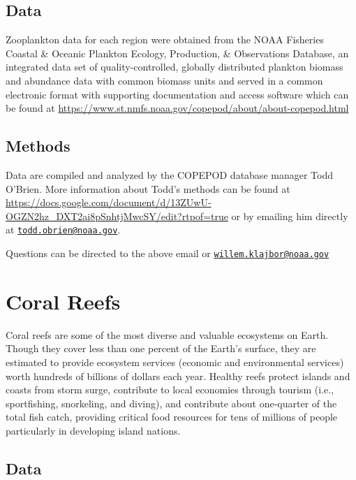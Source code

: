 \documentclass[
]{book}
\begin{document}
\hypertarget{data}{%
\section{Data}\label{data}}

Zooplankton data for each region were obtained from the NOAA Fisheries Coastal \& Oceanic Plankton Ecology, Production, \& Observations Database, an integrated data set of quality-controlled, globally distributed plankton biomass and abundance data with common biomass units and served in a common electronic format with supporting documentation and access software which can be found at \url{https://www.st.nmfs.noaa.gov/copepod/about/about-copepod.html}

\hypertarget{methods}{%
\section{Methods}\label{methods}}

Data are compiled and analyzed by the COPEPOD database manager Todd O'Brien. More information about Todd's methods can be found at \url{https://docs.google.com/document/d/13ZUwU-OGZN2hz_DXT2ai8pSnhtjMwcSY/edit?rtpof=true} or by emailing him directly at \href{mailto:todd.obrien@noaa.gov}{\nolinkurl{todd.obrien@noaa.gov}}.

Questions can be directed to the above email or \href{mailto:willem.klajbor@noaa.gov}{\nolinkurl{willem.klajbor@noaa.gov}}

\hypertarget{coral-reefs}{%
\chapter{Coral Reefs}\label{coral-reefs}}

Coral reefs are some of the most diverse and valuable ecosystems on Earth. Though they cover less than one percent of the Earth's surface, they are estimated to provide ecosystem services (economic and environmental services) worth hundreds of billions of dollars each year. Healthy reefs protect islands and coasts from storm surge, contribute to local economies through tourism (i.e., sportfishing, snorkeling, and diving), and contribute about one-quarter of the total fish catch, providing critical food resources for tens of millions of people particularly in developing island nations.

\hypertarget{data-1}{%
\section{Data}\label{data-1}}
\end{document}
